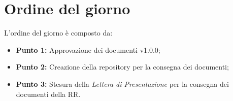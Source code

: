\section{Ordine del giorno}
L'ordine del giorno è composto da: 
\begin{itemize}
	\item \textbf{Punto 1:} Approvazione dei documenti v1.0.0;
	\item \textbf{Punto 2:} Creazione della repository per la consegna dei documenti;
	\item \textbf{Punto 3:} Stesura della \textit{Lettera di Presentazione} per la consegna dei documenti della RR.	
\end{itemize}

